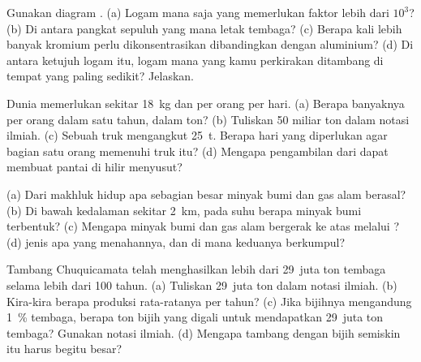 \begin{exercise}[$\star\star$]\label{exo:g9:earth-resources:7}
Gunakan diagram . (a) Logam mana saja yang memerlukan
faktor lebih dari $10^3$? (b) Di antara pangkat sepuluh yang mana letak
tembaga? (c) Berapa kali lebih banyak kromium perlu dikonsentrasikan
dibandingkan dengan aluminium? (d) Di antara ketujuh logam itu, logam
mana yang kamu perkirakan ditambang di tempat yang paling sedikit?
Jelaskan.
\end{exercise}

\begin{exercise}[$\star\star$]\label{exo:g9:earth-resources:8}
Dunia memerlukan sekitar \qty{18}{kg}  dan  per orang per
hari. (a) Berapa banyaknya per orang dalam satu tahun, dalam ton?
(b) Tuliskan 50 miliar ton dalam notasi ilmiah. (c) Sebuah truk
mengangkut \qty{25}{t}. Berapa hari yang diperlukan agar bagian satu
orang memenuhi truk itu? (d) Mengapa pengambilan  dari  dapat
membuat pantai di hilir menyusut?
\end{exercise}

\begin{exercise}[$\star\star$]\label{exo:g9:earth-resources:9}
(a) Dari makhluk hidup apa sebagian besar minyak bumi dan gas alam
berasal? (b) Di bawah kedalaman sekitar \qty{2}{km}, pada suhu berapa
minyak bumi terbentuk? (c) Mengapa minyak bumi dan gas alam bergerak ke
atas melalui ? (d)  jenis apa yang menahannya, dan di mana
keduanya berkumpul?
\end{exercise}

\begin{exercise}[$\star\star$]\label{exo:g9:earth-resources:10}
Tambang Chuquicamata telah menghasilkan lebih dari 29~juta ton tembaga
selama lebih dari 100 tahun. (a) Tuliskan 29~juta ton dalam notasi
ilmiah. (b) Kira-kira berapa produksi rata-ratanya per tahun? (c) Jika
bijihnya mengandung \qty{1}{\%} tembaga, berapa ton bijih yang digali
untuk mendapatkan 29~juta ton tembaga? Gunakan notasi ilmiah.
(d) Mengapa tambang dengan bijih semiskin itu harus begitu besar?
\end{exercise}

